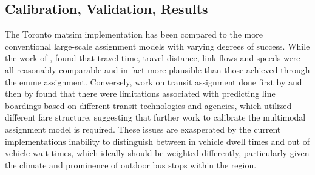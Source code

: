 \subsection{Calibration, Validation, Results}
The Toronto \gls{matsim} implementation has been compared to the more conventional large-scale assignment models with varying degrees of success. While the work of \citet[][]{GaoWEtAl_TRR_2010}, found that travel time, travel distance, link flows and speeds were all reasonably comparable and in fact more plausible than those achieved through the \gls{emme} assignment. Conversely, work on transit assignment done first by \citet[][]{Kucirek_MastersThesis_2012} and then by \citet[][]{WeissEtAl_CJCE_2012} found that there were limitations associated with predicting line boardings based on different transit technologies and agencies, which utilized different fare structure, suggesting that further work to calibrate the \gls{multimodal} assignment model is required. These issues are exasperated by the current implementations inability to distinguish between in vehicle dwell times and out of vehicle wait times, which ideally should be weighted differently, particularly given the climate and prominence of outdoor bus stops within the region. 



